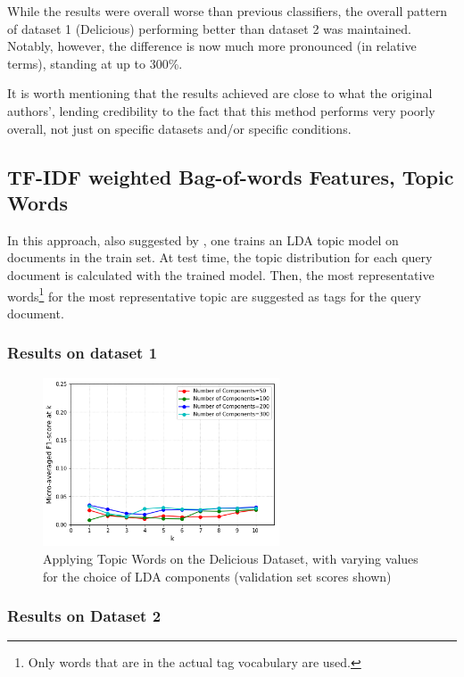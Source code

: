 While the results were overall worse than previous classifiers, the overall pattern of dataset 1 (Delicious) performing better than dataset 2 was maintained. Notably, however, the difference is now much more pronounced (in relative terms), standing at up to 300\%.

It is worth mentioning that the results achieved are close to what the original authors', lending credibility to the fact that this method performs very poorly overall, not just on specific datasets and/or specific conditions.

\subsection{TF-IDF weighted Bag-of-words Features, Topic Words}

In this approach, also suggested by \cite{choubey_2011}, one trains an LDA topic model on documents in the train set. At test time, the topic distribution for each query document is calculated with the trained model. Then, the most representative words\footnote{Only words that are in the actual tag vocabulary are used.} for the most representative topic are suggested as tags for the query document.

\subsubsection{Results on dataset 1}

\begin{figure}[H]
    \centering
    \includegraphics[width=7cm]{chapters/05_experiments/images/delicious-topic-words.png}
    \caption{Applying Topic Words on the Delicious Dataset, with varying values for the choice of LDA components (validation set scores shown)}
    \label{fig:topic_words_delicious}
\end{figure}

\subsubsection{Results on Dataset 2}

